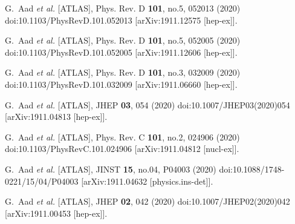 \begin{thebibliography}{9}
G.~Aad \textit{et al.} [ATLAS],
Phys. Rev. D \textbf{101}, no.5, 052013 (2020)
doi:10.1103/PhysRevD.101.052013
[arXiv:1911.12575 [hep-ex]].

G.~Aad \textit{et al.} [ATLAS],
Phys. Rev. D \textbf{101}, no.5, 052005 (2020)
doi:10.1103/PhysRevD.101.052005
[arXiv:1911.12606 [hep-ex]].

G.~Aad \textit{et al.} [ATLAS],
Phys. Rev. D \textbf{101}, no.3, 032009 (2020)
doi:10.1103/PhysRevD.101.032009
[arXiv:1911.06660 [hep-ex]].

G.~Aad \textit{et al.} [ATLAS],
JHEP \textbf{03}, 054 (2020)
doi:10.1007/JHEP03(2020)054
[arXiv:1911.04813 [hep-ex]].

G.~Aad \textit{et al.} [ATLAS],
Phys. Rev. C \textbf{101}, no.2, 024906 (2020)
doi:10.1103/PhysRevC.101.024906
[arXiv:1911.04812 [nucl-ex]].

G.~Aad \textit{et al.} [ATLAS],
JINST \textbf{15}, no.04, P04003 (2020)
doi:10.1088/1748-0221/15/04/P04003
[arXiv:1911.04632 [physics.ins-det]].

G.~Aad \textit{et al.} [ATLAS],
JHEP \textbf{02}, 042 (2020)
doi:10.1007/JHEP02(2020)042
[arXiv:1911.00453 [hep-ex]].


\end{thebibliography}

